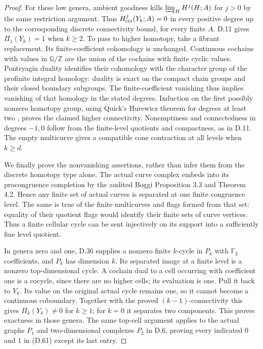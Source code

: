 \begin{proof}
For these low genera, ambient goodness kills
$\varinjlim_H H^j(H;A)$ for $j>0$ by the same restriction
argument.  Thus $H^j_{\rm cts}(Y_k;A)=0$ in every positive
degree up to the corresponding discrete connectivity bound,
for every finite $A$.  D.11 gives $\Pi_1(Y_k)=1$ when
$k\geq2$.  To pass to higher homotopy, take a fibrant
replacement.  Its finite-coefficient cohomology is unchanged.
Continuous cochains with values in $\mathbb Q/\mathbb Z$
are the union of the cochains with finite cyclic values.
Pontryagin duality identifies their cohomology with the
character group of the profinite integral homology: duality
is exact on the compact chain groups and their closed
boundary subgroups.  The finite-coefficient vanishing thus
implies vanishing of that homology in the stated degrees.
Induction on the first possibly nonzero homotopy group,
using Quick's Hurewicz theorem for degrees at least two
\cite[Theorem 2.30, p.~602]{D_Quick2008}, proves the claimed
higher connectivity.  Nonemptiness and connectedness in
degrees $-1,0$ follow from the finite-level quotients and
compactness, as in D.11.  The empty multicurve gives a
compatible cone contraction at all levels when $k\geq d$.

We finally prove the nonvanishing assertions, rather than
infer them from the discrete homotopy type alone.  The actual
curve complex embeds into its procongruence completion by
the audited Boggi Proposition 3.3 and Theorem 4.2.  Hence any
finite set of actual curves is separated at one finite
congruence level.  The same is true of the finite multicurves
and flags formed from that set: equality of their quotient
flags would identify their finite sets of curve vertices.
Thus a finite cellular cycle can be sent injectively on its
support into a sufficiently fine level quotient.

In genera zero and one, D.36 supplies a nonzero finite
$k$-cycle in $P_k$ with $\mathbb F_2$ coefficients, and
$P_k$ has dimension $k$.  Its separated image at a finite
level is a nonzero top-dimensional cycle.  A cochain dual
to a cell occurring with coefficient one is a cocycle,
since there are no higher cells; its evaluation is one.
Pull it back to $Y_k$.  Its value on the original actual
cycle remains one, so it cannot become a continuous
coboundary.  Together with the proved $(k-1)$-connectivity
this gives $\Pi_k(Y_k)\ne0$ for $k\geq1$; for $k=0$ it
separates two components.  This proves exactness in those
genera.  The same top-cell argument applies to the actual
graphs $P_1$ and two-dimensional complexes $P_2$ in D.6,
proving every indicated $0$ and $1$ in (D.61) except its
last entry.


\end{proof}
